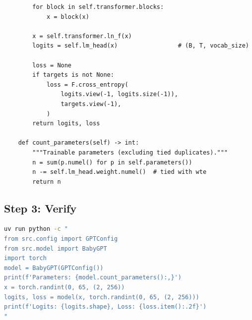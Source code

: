 \begin{lstlisting}
        for block in self.transformer.blocks:
            x = block(x)

        x = self.transformer.ln_f(x)
        logits = self.lm_head(x)                 # (B, T, vocab_size)

        loss = None
        if targets is not None:
            loss = F.cross_entropy(
                logits.view(-1, logits.size(-1)),
                targets.view(-1),
            )
        return logits, loss

    def count_parameters(self) -> int:
        """Trainable parameters (excluding tied duplicates)."""
        n = sum(p.numel() for p in self.parameters())
        n -= self.lm_head.weight.numel()  # tied with wte
        return n
\end{lstlisting}

\subsection{Step 3: Verify}

\shelltag
\begin{lstlisting}[language=bash]
uv run python -c "
from src.config import GPTConfig
from src.model import BabyGPT
import torch
model = BabyGPT(GPTConfig())
print(f'Parameters: {model.count_parameters():,}')
x = torch.randint(0, 65, (2, 256))
logits, loss = model(x, torch.randint(0, 65, (2, 256)))
print(f'Logits: {logits.shape}, Loss: {loss.item():.2f}')
"
\end{lstlisting}



